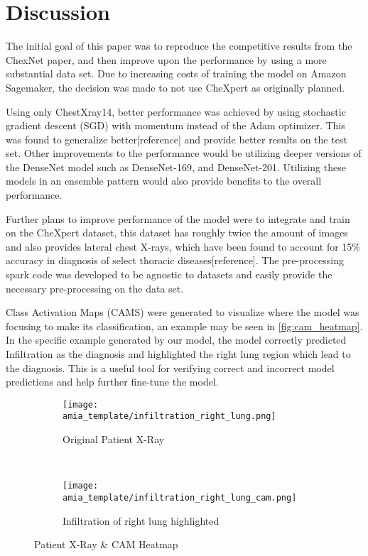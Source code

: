\documentclass{amia}
\begin{document}
\section*{Discussion}

The initial goal of this paper was to reproduce the competitive results from the ChexNet paper, and then improve upon the performance by using a more substantial data set. Due to increasing costs of training the model on Amazon Sagemaker, the decision was made to not use CheXpert as originally planned.

Using only ChestXray14, better performance was achieved by using stochastic gradient descent (SGD) with momentum instead of the Adam optimizer. This was found to generalize better[reference] and provide better results on the test set. Other improvements to the performance would be utilizing deeper versions of the DenseNet model such as DenseNet-169, and DenseNet-201. Utilizing these models in an ensemble pattern would also provide benefits to the overall performance.

Further plans to improve performance of the model were to integrate and train on the CheXpert dataset, this dataset has roughly twice the amount of images and also provides lateral chest X-rays, which have been found to account for 15\% accuracy in diagnosis of select thoracic diseases[reference]. The pre-processing spark code was developed to be agnostic to datasets and easily provide the necessary pre-processing on the data set.

Class Activation Maps (CAMS) were generated to visualize where the model was focusing to make its classification, an example may be seen in \ref{fig:cam_heatmap}. In the specific example generated by our model, the model correctly predicted Infiltration as the diagnosis and highlighted the right lung region which lead to the diagnosis. This is a useful tool for verifying correct and incorrect model predictions and help further fine-tune the model.

\begin{figure*}[t!]
    \centering
    \begin{subfigure}[t]{0.5\textwidth}
        \centering
        \texttt{[image: amia\_template/infiltration\_right\_lung.png]}
        \caption{Original Patient X-Ray}
    \end{subfigure}%
    ~
    \begin{subfigure}[t]{0.5\textwidth}
        \centering
        \texttt{[image: amia\_template/infiltration\_right\_lung\_cam.png]}
        \caption{Infiltration of right lung highlighted}
    \end{subfigure}
    \caption{Patient X-Ray & CAM Heatmap}
\end{figure*}
\end{document}
